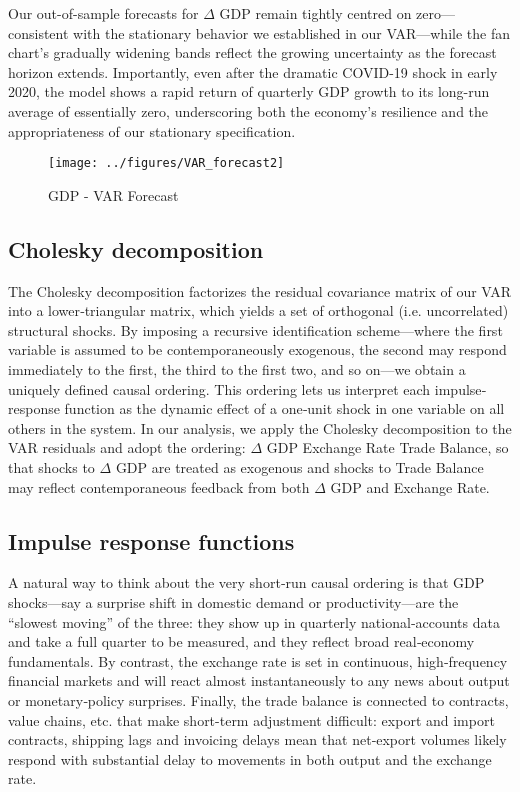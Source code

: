 \documentclass[
]{article}
\begin{document}
Our out-of-sample forecasts for $\Delta$ GDP remain tightly centred on zero—consistent 
with the stationary behavior we established in our VAR—while the fan chart’s 
gradually widening bands reflect the growing uncertainty as the forecast 
horizon extends. Importantly, even after the dramatic COVID-19 shock in early 
2020, the model shows a rapid return of quarterly GDP growth to its long-run 
average of essentially zero, underscoring both the economy’s resilience and 
the appropriateness of our stationary specification.

\begin{figure}

{\centering \texttt{[image: ../figures/VAR\_forecast2]} 

}

\caption{GDP - VAR Forecast}\label{fig:unnamed-chunk-23}
\end{figure}

\subsection{Cholesky decomposition}

The Cholesky decomposition factorizes the residual covariance matrix of our 
VAR into a lower‐triangular matrix, which yields a set of orthogonal
(i.e. uncorrelated) structural shocks. By imposing a recursive identification
scheme—where the first variable is assumed to be contemporaneously exogenous, 
the second may respond immediately to the first, the third to the first two,
and so on—we obtain a uniquely defined causal ordering. This ordering lets us 
interpret each impulse‐response function as the dynamic effect of a one‐unit 
shock in one variable on all others in the system. In our analysis, we apply 
the Cholesky decomposition to the VAR residuals and adopt the 
ordering: $\Delta$ GDP \textrightarrow Exchange Rate \textrightarrow Trade Balance, 
so that shocks to  $\Delta$ GDP are treated as exogenous and shocks to Trade Balance 
may reflect contemporaneous feedback from both $\Delta$ GDP and Exchange Rate.

\subsection{Impulse response functions}

A natural way to think about the very short‐run causal ordering is that GDP 
shocks—say a surprise shift in domestic demand or productivity—are the 
“slowest moving” of the three: they show up in quarterly national‐accounts 
data and take a full quarter to be measured, and they reflect broad real‐economy
fundamentals. By contrast, the exchange rate is set in continuous, 
high‐frequency financial markets and will react almost instantaneously to 
any news about output or monetary‐policy surprises. Finally, the trade balance 
is connected to contracts, value chains, etc. that make short-term adjustment 
difficult: export and import contracts, shipping lags and invoicing delays mean
that net‐export volumes likely respond with substantial delay to movements
in both output and the exchange rate.
\end{document}

